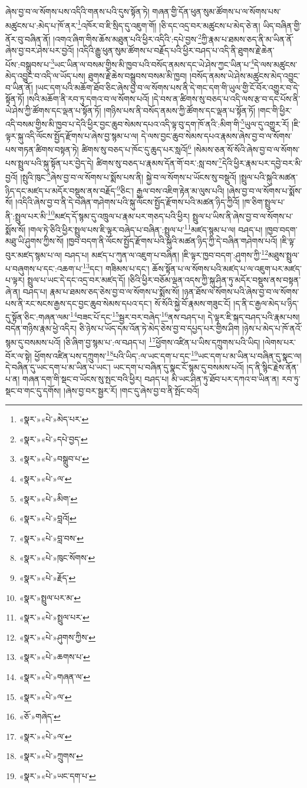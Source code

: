 ཞེས་བྱ་བ་ལ་སོགས་པས་འདིའི་གནས་པའི་དུས་སྟོན་ཏེ། གཞན་གྱི་དོན་ཕུན་སུམ་ཚོགས་པ་ལ་སོགས་པས་མཚུངས་པ་:མེད་པ་ཁོ་ནར་\footnote{«སྣར་»«པེ་»མེད་པར་}འཁོར་བ་ཇི་སྲིད་དུ་འཇུག་གོ། །ཅི་དང་འདྲ་བར་མཚུངས་པ་མེད་ཅེ་ན། ཡིད་བཞིན་གྱི་ནོར་བུ་བཞིན་ནོ། །འགའ་ཞིག་གིས་ཆོས་མཐུན་པའི་ཕྱིར་འདིའི་:དཔེ་བྱས་\footnote{«སྣར་»«པེ་»དཔེ་བྱད་}ཀྱི་རྣམ་པ་ཐམས་ཅད་ནི་མ་ཡིན་ནོ་ཞེས་བྱ་བར་ཤེས་པར་བྱའོ། །འདིའི་རྒྱུ་ཕུན་སུམ་ཚོགས་པ་བརྗོད་པའི་ཕྱིར་བཤད་པ་འདི་ནི་ཐུགས་རྗེ་ཆེན་པོས་:བསྒྲུབས་པ་\footnote{«སྣར་»«པེ་»བསྒྲུབ་པ་}ཡང་ཡིན་ལ་བསམ་གྱིས་མི་ཁྱབ་པའི་བསོད་ནམས་དང་ཡེ་ཤེས་ཀྱང་ཡིན་པ་\footnote{«སྣར་»«པེ་»ལ་}དེ་ལས་མཚུངས་མེད་འབྱུང་བ་འདི་ལ་ཡོད་པས། ཐུགས་རྗེ་ཆེས་བསྒྲུབས་བསམ་མི་ཁྱབ། །བསོད་ནམས་ཡེ་ཤེས་མཚུངས་མེད་འབྱུང་བ་ཡིན་ནོ། །ཡང་དག་པའི་མཆོག་ཐོབ་ཅིང་ཞེས་བྱ་བ་ལ་སོགས་པས་ནི་དེ་གང་དག་གི་ཡུལ་གྱི་ངོ་བོར་འགྱུར་བ་དེ་སྟོན་ཏོ། །སའི་མཆོག་ནི་རབ་ཏུ་དགའ་བ་ལ་སོགས་པའོ། །དེ་བས་ན་ཚིགས་སུ་བཅད་པ་འདི་ལས་རྩ་བ་དང་པོས་ནི་ཡེ་ཤེས་ཀྱི་ཚོགས་དང་ལྡན་པ་སྟོན་ཏོ། །གཉིས་པས་ནི་བསོད་ནམས་ཀྱི་ཚོགས་དང་ལྡན་པ་སྟོན་ཏོ། །གང་གི་ཕྱིར་འདི་བསམ་གྱིས་མི་ཁྱབ་པ་དེའི་ཕྱིར་བྱང་ཆུབ་སེམས་དཔའ་འདི་ལྟ་བུ་དག་ཁོ་ནའི་:མིག་གི་\footnote{«སྣར་»«པེ་»མིག་}ཡུལ་དུ་འགྱུར་རོ། །ཇི་ལྟར་སྐུ་འདི་ལོངས་སྤྱོད་རྫོགས་པ་ཞེས་བྱ་སྙམ་པ་ལ། དེ་ལས་བྱང་ཆུབ་སེམས་དཔའ་རྣམས་ཞེས་བྱ་བ་ལ་སོགས་པས་གཏན་ཚིགས་བསྟན་ཏེ། ཚིགས་སུ་བཅད་པ་ཁོང་དུ་ཆུད་པར་སླའོ།\footnote{«སྣར་»«པེ་»བླའོ།} །སེམས་ཅན་སོ་སོའི་ཞེས་བྱ་བ་ལ་སོགས་པས་སྤྲུལ་པའི་སྐུ་སྟོན་པར་བྱེད་དེ། ཚིགས་སུ་བཅད་པ་རྣམས་དོན་གོ་བར་:སླ་བས་\footnote{«སྣར་»«པེ་»བླ་བས་}དེའི་ཕྱིར་རྣམ་པར་དབྱེ་བར་མི་བྱའོ། །སྤུའི་ཁུང་\footnote{«སྣར་»«པེ་»ཁུང་སོགས་}ཞེས་བྱ་བ་ལ་སོགས་པ་སྨོས་པས་ནི། སྐྱེ་བ་ལ་སོགས་པ་ཡོངས་སུ་བསྡུའོ། །སྤྲུལ་པའི་སྐུའི་མཚན་ཉིད་དང་མཛད་པ་མདོར་བསྡུས་ནས་བརྗོད་\footnote{«སྣར་»«པེ་»རྗོད་}ཅིང་། རྒྱལ་བས་འཇིག་རྟེན་མ་ལུས་པའི། །ཞེས་བྱ་བ་ལ་སོགས་པ་སྨོས་སོ། །འདིའི་ཞེས་བྱ་བ་ནི་དེ་བཞིན་གཤེགས་པའི་སྐུ་ལོངས་སྤྱོད་རྫོགས་པའི་མཚན་ཉིད་ཀྱིའོ། །ཁ་ཅིག་སྤྲུལ་པ་ནི་:སྤྲུལ་པར་མི་\footnote{«སྣར་»སྤྲུལ་པར་མ་}མཛད་དོ་སྙམ་དུ་འཁྲུལ་པ་རྣམ་པར་གཅད་པའི་ཕྱིར། སྤྲུལ་པ་ཡིས་ནི་ཞེས་བྱ་བ་ལ་སོགས་པ་སྨོས་སོ། །གལ་ཏེ་ཅིའི་ཕྱིར་སྤྲུལ་པས་ཇི་ལྟར་བཞེད་པ་བཞིན་:སྤྲུལ་པ་\footnote{«སྣར་»«པེ་»སྤྲུལ་པར་}མཛད་སྙམ་པ་ལ། བཤད་པ། །ཁྱབ་བདག་མཐུ་ཡི་ཤུགས་ཀྱིས་སོ། །ཁྱབ་བདག་ནི་ལོངས་སྤྱོད་རྫོགས་པའི་སྐུའི་མཚན་ཉིད་ཀྱི་དེ་བཞིན་གཤེགས་པའོ། །ཇི་ལྟ་བུར་མཛད་སྙམ་པ་ལ། བཤད་པ། མཛད་པ་ཀུན་ལ་འཇུག་པ་བཞིན། །ཇི་ལྟར་ཁྱབ་བདག་:ཤུགས་ཀྱི་\footnote{«སྣར་»«པེ་»ཤུགས་ཀྱིས་}མཐུས་སྤྲུལ་པ་བཞུགས་པ་དང་:འཆག་པ་\footnote{«སྣར་»«པེ་»ཆགས་པ་}དང་། གཟིམས་པ་དང་། ཆོས་སྟོན་པ་ལ་སོགས་པའི་མཛད་པ་ལ་འཇུག་པར་མཛད་པ་ལྟར། སྤྲུལ་པ་ཡང་དེ་དང་འདྲ་བར་མཛད་དོ། །ཅིའི་ཕྱིར་བཅོམ་ལྡན་འདས་ཀྱི་སྐུ་ཤིན་ཏུ་མདོར་བསྡུས་ནས་བསྟན་ཞེ་ན། བཤད་པ། རྣམ་པ་ཐམས་ཅད་ཅེས་བྱ་བ་ལ་སོགས་པ་སྨོས་སོ། །ཉན་ཐོས་ལ་སོགས་པའི་ཞེས་བྱ་བ་ལ་སོགས་པས་ནི་རང་སངས་རྒྱས་དང་བྱང་ཆུབ་སེམས་དཔའ་དང་། སོ་སོའི་སྐྱེ་བོ་རྣམས་གཟུང་ངོ། །ད་ནི་ང་རྒྱལ་མེད་པ་ཉིད་དུ་སྟོན་ཅིང་:གཞན་ལམ་\footnote{«སྣར་»«པེ་»གཞན་ལ་}བཟང་པོ་དང་\footnote{«སྣར་»«པེ་»ལ་}སྦྱར་བར་བཞེད་\footnote{«ཅོ་»གཞེད་}ནས་བཤད་པ། དེ་ལྟར་ཇི་སྐད་བཤད་པའི་རྣམ་པས། བདེན་གཉིས་རྣམ་ཕྱེ་འདིར། ཅི་ཉེས་པ་ཡོད་དམ་འོན་ཏེ་མེད་ཅེས་བྱ་བ་དཔྱད་པར་གྱིས་ཤིག །ཉེས་པ་མེད་པ་ཁོ་ནའོ་སྙམ་དུ་བསམས་པའོ། །ཅི་ཞིག་བྱ་སྙམ་པ་:ལ་བཤད་པ། \footnote{«སྣར་»«པེ་»ལ་}ཕྱོགས་འཛིན་པ་ཡིས་དཀྲུགས་པའི་ཡིད། །ལེགས་པར་བོར་ལ་སྟེ། ཕྱོགས་འཛིན་པས་དཀྲུགས་\footnote{«སྣར་»«པེ་»ཀྲུགས་}པའི་ཡིད་:ལ་ཡང་དག་པ་དང་\footnote{«སྣར་»«པེ་»ཡང་དག་པ་}ཡང་དག་པ་མ་ཡིན་པ་བཞིན་དུ་སྣང་ལ། དེ་བཞིན་དུ་ཡང་དག་པ་མ་ཡིན་པ་ཡང་། ཡང་དག་པ་བཞིན་དུ་སྣང་ངོ་སྙམ་དུ་བསམས་པའོ། །ད་ནི་སྙིང་རྗེས་ནོན་པ་ན། གཞན་དག་གི་སྡང་བ་ཡོངས་སུ་སྤང་བའི་ཕྱིར། བཤད་པ། མི་ཡང་ཤིན་ཏུ་ཐོབ་པར་དཀའ་བ་ཡིན་ན། རབ་ཏུ་སྡང་བ་གང་དུ་དགོས། །ཞེས་བྱ་བར་སྦྱར་རོ། །གང་དུ་ཞེས་བྱ་བ་ནི་སྤོང་བའོ། 